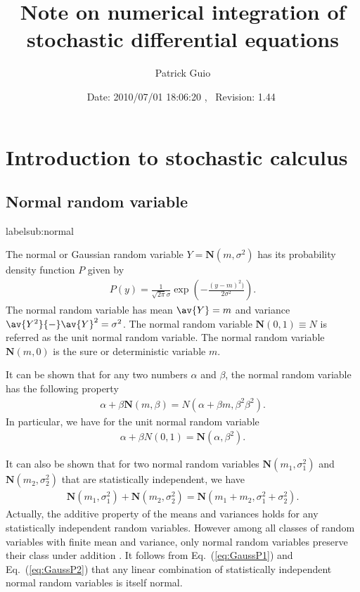 \documentclass[10pt,a4paper]{article}
\title{Note on numerical integration of stochastic differential equations}
\author{Patrick Guio}
\date{\normalsize$ $Date: 2010/07/01 18:06:20 $ $,~ $ $Revision: 1.44 $ $}
\newcommand{\eq}[1]{Eq.~(\ref{#1})}
\newcommand{\gaussian}{\ensuremath{\mathbf{N}}}
\begin{document}
\maketitle

\section{Introduction to stochastic calculus}

\subsection{Normal random variable}
label{sub:normal}

The normal or Gaussian random variable $Y=\gaussian(m,\sigma^2)$ has its 
probability density function $P$ given by
\begin{align}
P(y)=\frac{1}{\sqrt{2\pi}\sigma}\exp\left(-\frac{(y-m)^2)}{2\sigma^2}\right).
\end{align}
The normal random variable has mean $\av{Y}=m$ and variance 
$\av{Y^2}{-}\av{Y}^2=\sigma^2$. The normal random variable
$\gaussian(0,1)\equiv N$ is referred as the unit normal random variable.
The normal random variable $\gaussian(m,0)$ is the sure or deterministic
variable $m$.

It can be shown that for any two numbers $\alpha$ and $\beta$, the normal
random variable has the following property \citep{gillespie:1996a}
\begin{align}
\alpha+\beta\gaussian(m,\beta) = N(\alpha+\beta m,\beta^2\beta^2).
\label{eq:GaussP1}
\end{align}
In particular, we have for the unit normal random variable
\begin{align}
\alpha+\beta N(0,1) = \gaussian(\alpha,\beta^2).\label{eq:unitGaussP1}
\end{align}

It can also be shown that for two normal random variables 
$\gaussian(m_1,\sigma_1^2)$ and $\gaussian(m_2,\sigma_2^2)$ that are
statistically independent, we have 
\begin{align}
\gaussian(m_1,\sigma_1^2)+\gaussian(m_2,\sigma_2^2)=
\gaussian(m_1+m_2,\sigma_1^2+\sigma_2^2).
\label{eq:GaussP2}
\end{align}
Actually, the additive property of the means and variances holds for any
statistically independent random variables. However among all classes of
random variables with finite mean and variance, only normal random variables
preserve their class under addition \citep{gillespie:1996a}.
It follows from \eq{eq:GaussP1} and \eq{eq:GaussP2} that any linear
combination of statistically independent normal random variables is itself
normal.
\end{document}
